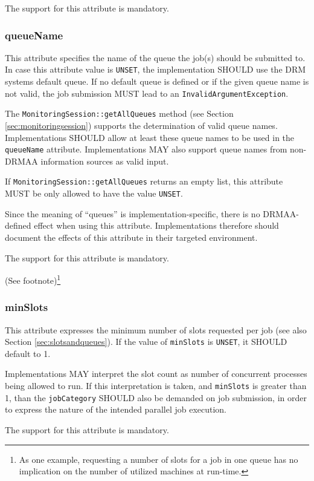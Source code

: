 \documentclass{article}
\newcommand{\h}[1]{\lstinline|#1|}
\newcommand{\rat}[1]{ {\tiny(See footnote)}\footnote{#1} }
\begin{document}
The support for this attribute is mandatory.

\subsubsection{queueName}
\label{sec:queuename}

This attribute specifies the name of the queue the job(s) should be submitted to. In case this attribute value is \h{UNSET}, the implementation SHOULD use the DRM systems default queue.  If no default queue is defined or if the given queue name is not valid, the job submission MUST lead to an \h{InvalidArgumentException}.

The \h{MonitoringSession::getAllQueues} method (see Section \ref{sec:monitoringsession}) supports the determination of valid queue names. Implementations SHOULD allow at least these queue names to be used in the \h{queueName} attribute. Implementations MAY also support queue names from non-DRMAA information sources as valid input. 

If \h{MonitoringSession::getAllQueues} returns an empty list, this attribute MUST be only allowed to have the value \h{UNSET}. 

Since the meaning of \enquote{queues} is implementation-specific, there is no DRMAA-defined effect when using this attribute. Implementations therefore should document the effects of this attribute in their targeted environment. 

The support for this attribute is mandatory.

\rat{As one example, requesting a number of slots for a job in one queue has no implication on the number of utilized machines at run-time.}

\subsubsection{minSlots}

This attribute expresses the minimum number of slots requested per job (see also Section \ref{sec:slotsandqueues}). If the value of \h{minSlots} is \h{UNSET}, it SHOULD default to 1.

Implementations MAY interpret the slot count as number of concurrent processes being allowed to run. If this interpretation is taken, and \h{minSlots} is greater than 1, than the \h{jobCategory} SHOULD also be demanded on job submission, in order to express the nature of the intended parallel job execution.

The support for this attribute is mandatory.
\end{document}
